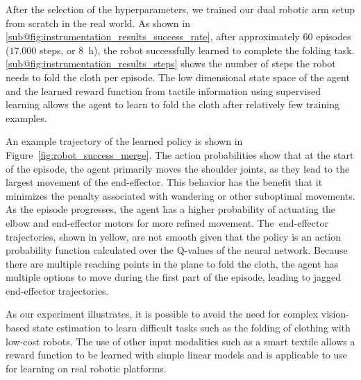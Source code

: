 \documentclass[\home/main.tex]{subfiles}
\begin{document}
After the selection of the hyperparameters, we trained our dual robotic arm setup from scratch in the real world. As shown in \cref{sub@fig:instrumentation_results_success_rate}, after approximately $60$ episodes ($17.000$ steps, or \qty{8}{\hour}), the robot successfully learned to complete the folding task. \cref{sub@fig:instrumentation_results_steps} shows the number of steps the robot needs to fold the cloth per episode. The low dimensional state space of the agent and the learned reward function from tactile information using supervised learning allows the agent to learn to fold the cloth after relatively few training examples.

An example trajectory of the learned policy is shown in Figure~\ref{fig:robot_success_merge}. The action probabilities show that at the start of the episode, the agent primarily moves the shoulder joints, as they lead to the largest movement of the end-effector. This behavior has the benefit that it minimizes the penalty associated with wandering or other suboptimal movements. As the episode progresses, the agent has a higher probability of actuating the elbow and end-effector motors for more refined movement. The~end-effector trajectories, shown in yellow, are not smooth given that the policy is an action probability function calculated over the Q-values of the neural network. Because there are multiple reaching points in the plane to fold the cloth, the agent has multiple options to move during the first part of the episode, leading to jagged end-effector trajectories.

As our experiment illustrates, it is possible to avoid the need for complex vision-based state estimation to learn difficult tasks such as the folding of clothing with low-cost robots. The use of other input modalities such as a smart textile allows a reward function to be learned with simple linear models and is applicable to use for learning on real robotic platforms.
\end{document}
